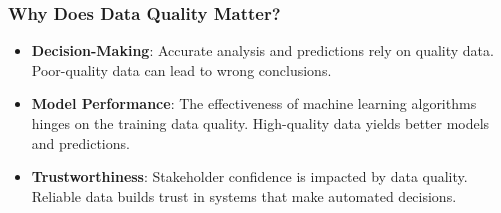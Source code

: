 \documentclass[aspectratio=169]{beamer}
\begin{document}
\begin{frame}[fragile]
    \frametitle{Why Does Data Quality Matter?}
    \begin{itemize}
        \item \textbf{Decision-Making}: Accurate analysis and predictions rely on quality data. Poor-quality data can lead to wrong conclusions.
        \item \textbf{Model Performance}: The effectiveness of machine learning algorithms hinges on the training data quality. High-quality data yields better models and predictions.
        \item \textbf{Trustworthiness}: Stakeholder confidence is impacted by data quality. Reliable data builds trust in systems that make automated decisions.
    \end{itemize}
\end{frame}
\end{document}
